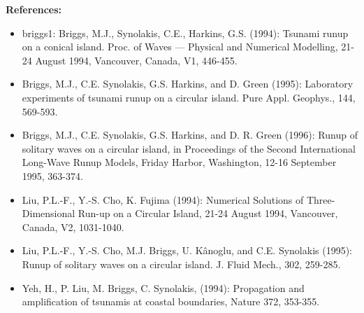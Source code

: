 {\bf References:}
\begin {itemize}

\item briggs1:  Briggs, M.J., Synolakis, C.E., Harkins, G.S. (1994):  Tsunami runup on a conical island.  Proc. of Waves — Physical and Numerical Modelling, 21-24 August 1994, Vancouver, Canada, V1, 446-455.
\item Briggs, M.J., C.E. Synolakis, G.S. Harkins, and D. Green (1995): Laboratory experiments of tsunami runup on a circular island. Pure Appl. Geophys., 144, 569-593.
\item Briggs, M.J., C.E. Synolakis, G.S. Harkins, and D. R. Green (1996): Runup of solitary waves on a circular island, in Proceedings of the Second International Long-Wave Runup Models, Friday Harbor, Washington, 12-16 September 1995, 363-374.
\item Liu, P.L.-F., Y.-S. Cho, K. Fujima (1994):  Numerical Solutions of Three-Dimensional Run-up on a Circular Island, 21-24 August 1994, Vancouver, Canada, V2, 1031-1040.
\item Liu, P.L.-F., Y.-S. Cho, M.J. Briggs, U. Kânoglu, and C.E. Synolakis (1995): Runup of solitary waves on a circular island. J. Fluid Mech., 302, 259-285.
\item Yeh, H., P. Liu, M. Briggs, C. Synolakis, (1994): Propagation and amplification of tsunamis at coastal boundaries, Nature 372, 353-355.
\end{itemize}


